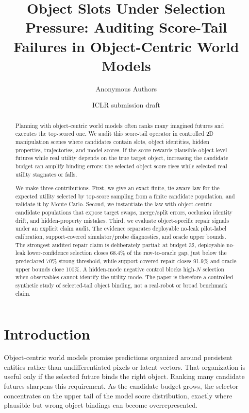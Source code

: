\documentclass[10pt]{article}
\title{\vspace{-1.0em}Object Slots Under Selection Pressure: Auditing Score-Tail Failures in Object-Centric World Models}
\author{Anonymous Authors}
\date{ICLR submission draft}
\begin{document}
\maketitle

\begin{abstract}
Planning with object-centric world models often ranks many imagined futures and executes the top-scored one. We audit this score-tail operator in controlled 2D manipulation scenes where candidates contain slots, object identities, hidden properties, trajectories, and model scores. If the score rewards plausible object-level futures while real utility depends on the true target object, increasing the candidate budget can amplify binding errors: the selected object score rises while selected real utility stagnates or falls.

We make three contributions. First, we give an exact finite, tie-aware law for the expected utility selected by top-score sampling from a finite candidate population, and validate it by Monte Carlo. Second, we instantiate the law with object-centric candidate populations that expose target swaps, merge/split errors, occlusion identity drift, and hidden-property mistakes. Third, we evaluate object-specific repair signals under an explicit claim audit. The evidence separates deployable no-leak pilot-label calibration, support-covered simulator/probe diagnostics, and oracle upper bounds. The strongest audited repair claim is deliberately partial: at budget 32, deployable no-leak lower-confidence selection closes 68.4\% of the raw-to-oracle gap, just below the predeclared 70\% strong threshold, while support-covered repair closes 91.9\% and oracle upper bounds close 100\%. A hidden-mode negative control blocks high-$N$ selection when observables cannot identify the utility mode. The paper is therefore a controlled synthetic study of selected-tail object binding, not a real-robot or broad benchmark claim.
\end{abstract}

\section{Introduction}

Object-centric world models promise predictions organized around persistent entities rather than undifferentiated pixels or latent vectors. That organization is useful only if the selected future binds the right object. Ranking many candidate futures sharpens this requirement. As the candidate budget grows, the selector concentrates on the upper tail of the model score distribution, exactly where plausible but wrong object bindings can become overrepresented.
\end{document}
